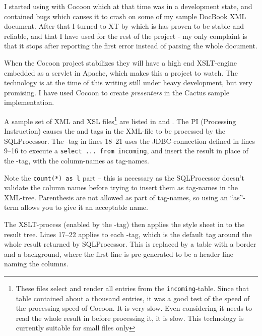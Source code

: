 I started using  with Cocoon
which at that time was in a development state, and contained bugs
which causes it to crash on some of my sample DocBook XML document.
After that I turned to XT by  which is has proven to be stable and reliable, and that I
have used for the rest of the project - my only complaint is that it
stops after reporting the first error instead of parsing the whole
document.


When the Cocoon project stabilizes they will have a
high end XSLT-engine embedded as a servlet in Apache, which makes this
a project to watch.  The technology is at the time of this writing
still under heavy development, but very promising.  I have used Cocoon
to create \textit{presenters} in the Cactus sample implementation.

A sample set of XML and XSL files\footnote{These files select and
  render all entries from the \texttt{incoming}-table.  Since that
  table contained about a thousand entries, it was a good test of the
  speed of the processing speed of Cocoon.  It is very slow.  Even
  considering it needs to read the whole result in before processing
  it, it is slow.  This technology is currently suitable for small
  files only} are listed in 
  and .  The
   PI (Processing Instruction) causes
  the  and  tags in the XML-file to be
  processed by the SQLProcessor.  The -tag in lines 18--21
  uses the JDBC-connection defined in lines 9--16 to execute a
  \texttt{select ... from incoming}, and insert the result in place of
  the -tag, with the column-names as tag-names.

Note the \texttt{count(*) as l} part -- this is necessary as the
SQLProcessor doesn't validate the column names before trying to insert
them as tag-names in the XML-tree.  Parenthesis are not allowed as
part of tag-names, so using an ``as''-term allows you to give it an
acceptable name.

The XSLT-process (enabled by the -tag) then applies the style sheet in
 to the result tree.  Lines
17--22 applies to each -tag, which is the default tag
around the whole result returned by SQLProcessor.  This is replaced
by a table with a border and a background, where the first line is
pre-generated to be a header line naming the columns.

